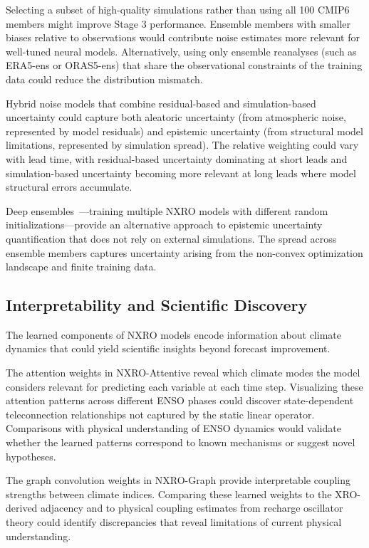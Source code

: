 Selecting a subset of high-quality simulations rather than using all 100 CMIP6 members might improve Stage 3 performance. Ensemble members with smaller biases relative to observations would contribute noise estimates more relevant for well-tuned neural models. Alternatively, using only ensemble reanalyses (such as ERA5-ens or ORAS5-ens) that share the observational constraints of the training data could reduce the distribution mismatch.

Hybrid noise models that combine residual-based and simulation-based uncertainty could capture both aleatoric uncertainty (from atmospheric noise, represented by model residuals) and epistemic uncertainty (from structural model limitations, represented by simulation spread). The relative weighting could vary with lead time, with residual-based uncertainty dominating at short leads and simulation-based uncertainty becoming more relevant at long leads where model structural errors accumulate.

Deep ensembles~\cite{lakshminarayanan2017simple}---training multiple NXRO models with different random initializations---provide an alternative approach to epistemic uncertainty quantification that does not rely on external simulations. The spread across ensemble members captures uncertainty arising from the non-convex optimization landscape and finite training data.

\subsection{Interpretability and Scientific Discovery}

The learned components of NXRO models encode information about climate dynamics that could yield scientific insights beyond forecast improvement.

The attention weights in NXRO-Attentive reveal which climate modes the model considers relevant for predicting each variable at each time step. Visualizing these attention patterns across different ENSO phases could discover state-dependent teleconnection relationships not captured by the static linear operator. Comparisons with physical understanding of ENSO dynamics would validate whether the learned patterns correspond to known mechanisms or suggest novel hypotheses.

The graph convolution weights in NXRO-Graph provide interpretable coupling strengths between climate indices. Comparing these learned weights to the XRO-derived adjacency and to physical coupling estimates from recharge oscillator theory could identify discrepancies that reveal limitations of current physical understanding.

